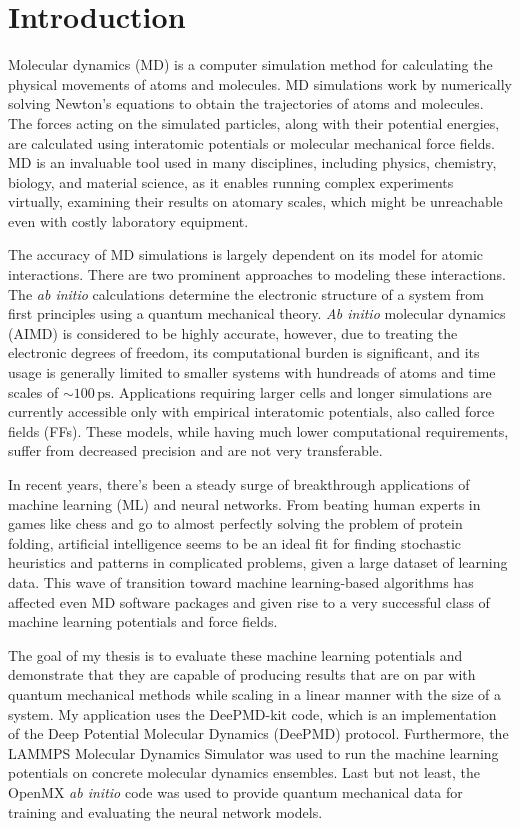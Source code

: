 \chapter{Introduction}

Molecular dynamics (MD) is a computer simulation method for calculating the
physical movements of atoms and molecules. MD simulations work by numerically
solving Newton's equations to obtain the trajectories of atoms and molecules.
The forces acting on the simulated particles, along with their potential
energies, are calculated using interatomic potentials or molecular mechanical
force fields. MD is an invaluable tool used in many disciplines, including
physics, chemistry, biology, and material science, as it enables running
complex experiments virtually, examining their results on atomary scales,
which might be unreachable even with costly laboratory equipment.

The accuracy of MD simulations is largely dependent on its model for atomic
interactions. There are two prominent approaches to modeling these
interactions. The \textit{ab initio} calculations determine the electronic
structure of a system from first principles using a quantum mechanical theory.
\textit{Ab initio} molecular dynamics (AIMD) is considered to be highly
accurate, however, due to treating the electronic degrees of freedom, its
computational burden is significant, and its usage is generally limited to
smaller systems with hundreads of atoms and time scales of
$\sim 100 \, \mathrm{ps}$. Applications requiring larger cells and longer
simulations are currently accessible only with empirical interatomic
potentials, also called force fields (FFs). These models, while having much
lower computational requirements, suffer from decreased precision and
are not very transferable.

In recent years, there's been a steady surge of breakthrough applications of
machine learning (ML) and neural networks. From beating human experts in
games like chess and go to almost perfectly solving the problem of protein
folding, artificial intelligence seems to be an ideal fit for finding
stochastic heuristics and patterns in complicated problems, given a large
dataset of learning data. This wave of transition toward machine
learning-based algorithms has affected even MD software packages and given
rise to a very successful class of machine learning potentials and force
fields.

The goal of my thesis is to evaluate these machine learning potentials and
demonstrate that they are capable of producing results that are on par with
quantum mechanical methods while scaling in a linear manner with the size of a
system. My application uses the DeePMD-kit code, which is an implementation of
the Deep Potential Molecular Dynamics (DeePMD) protocol. Furthermore, the
LAMMPS Molecular Dynamics Simulator was used to run the machine learning
potentials on concrete molecular dynamics ensembles. Last but not least, the
OpenMX \textit{ab initio} code was used to provide quantum mechanical data
for training and evaluating the neural network models.

%
%

